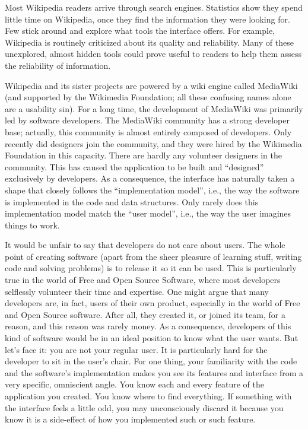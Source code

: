 Most Wikipedia readers arrive through search engines. Statistics show they spend little time on Wikipedia, once they find the information they were looking for. Few stick around and explore what tools the interface offers. For example, Wikipedia is routinely criticized about its quality and reliability. Many of these unexplored, almost hidden tools could prove useful to readers to help them assess the reliability of information.

Wikipedia and its sister projects are powered by a wiki engine called MediaWiki (and supported by the Wikimedia Foundation; all these confusing names alone are a usability sin). For a long time, the development of MediaWiki was primarily led by software developers. The MediaWiki community has a strong developer base; actually, this community is almost entirely composed of developers. Only recently did designers join the community, and they were hired by the Wikimedia Foundation in this capacity. There are hardly any volunteer designers in the community. This has caused the application to be built and ``designed'' exclusively by developers. As a consequence, the interface has naturally taken a shape that closely follows the ``implementation model'', i.e., the way the software is implemented in the code and data structures. Only rarely does this implementation model match the ``user model'', i.e., the way the user imagines things to work.

It would be unfair to say that developers do not care about users. The whole point of creating software (apart from the sheer pleasure of learning stuff, writing code and solving problems) is to release it so it can be used. This is particularly true in the world of Free and Open Source Software, where most developers selflessly volunteer their time and expertise. One might argue that many developers are, in fact, users of their own product, especially in the world of Free and Open Source software. After all, they created it, or joined its team, for a reason, and this reason was rarely money. As a consequence, developers of this kind of software would be in an ideal position to know what the user wants.
\newline
But let's face it: you are not your regular user.
\newline
It is particularly hard for the developer to sit in the user's chair. For one thing, your familiarity with the code and the software's implementation makes you see its features and interface from a very specific, omniscient angle. You know each and every feature of the application you created. You know where to find everything. If something with the interface feels a little odd, you may unconsciously discard it because you know it is a side-effect of how you implemented such or such feature.

